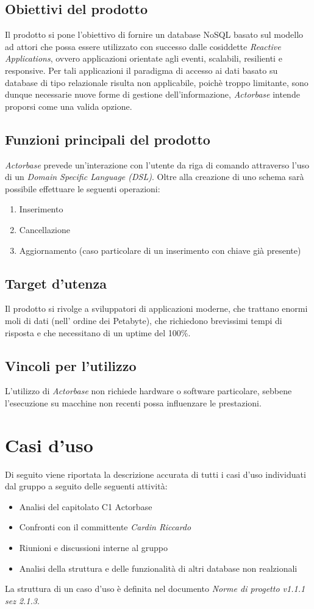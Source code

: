 \documentclass[a4paper]{report}
\newcommand{\mychapter}[2]{
	\setcounter{chapter}{#1}
	\setcounter{section}{0}
	\setcounter{subsection}{1}
	\chapter*{#2}
	\addcontentsline{toc}{chapter}{#2}
}
\begin{document}
	\section{Obiettivi del prodotto}
		Il prodotto si pone l'obiettivo di fornire un database NoSQL basato sul modello ad attori che possa 
		essere utilizzato con successo dalle cosiddette \emph{Reactive Applications}, ovvero applicazioni
		orientate agli eventi, scalabili, resilienti e responsive. Per tali applicazioni il paradigma di accesso 
		ai dati basato su database di tipo relazionale risulta non applicabile, poichè troppo limitante, sono 
		dunque necessarie nuove forme di gestione dell'informazione, \emph{Actorbase} intende proporsi 
		come una valida opzione.
	\section{Funzioni principali del prodotto}
		\emph{Actorbase} prevede un'interazione con l'utente da riga di comando attraverso l'uso di un 
		\emph{Domain Specific Language (DSL)}. 
		Oltre alla creazione di uno schema sarà possibile effettuare le seguenti operazioni:
		\begin{enumerate}
			\item Inserimento
			\item Cancellazione 
			\item Aggiornamento (caso particolare di un inserimento con chiave già presente)
		\end{enumerate}
	\section{Target d'utenza}
		Il prodotto si rivolge a sviluppatori di applicazioni moderne, che trattano enormi moli di dati (nell'
		ordine dei Petabyte), che richiedono brevissimi tempi di risposta e che necessitano di un uptime 
		del 100\%.
	\section{Vincoli per l'utilizzo}
		L'utilizzo di \emph{Actorbase} non richiede hardware o software particolare, sebbene l'esecuzione 
		su macchine non recenti possa influenzare le prestazioni.	
	
	\mychapter{3}{Casi d'uso}
		Di seguito viene riportata la descrizione accurata di tutti i casi d'uso individuati dal gruppo a seguito
		delle seguenti attività:
		\begin{itemize}
			\item Analisi del capitolato C1 Actorbase
			\item Confronti con il committente \emph{Cardin Riccardo}
			\item Riunioni e discussioni interne al gruppo
			\item Analisi della struttura e delle funzionalità di altri database non realzionali
		\end{itemize}
		La struttura di un caso d'uso è definita nel documento \emph{Norme di progetto v1.1.1 sez 2.1.3}.
		\newpage
\end{document}
